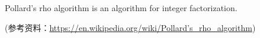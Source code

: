 \documentclass[a4paper, justified]{tufte-handout}
\begin{document}

\begin{ot}	
	Pollard's rho algorithm is an algorithm for integer factorization.
	
	(参考资料：\href{https://en.wikipedia.org/wiki/Pollard's_rho_algorithm}{https://en.wikipedia.org/wiki/Pollard's\_rho\_algorithm})
\end{ot}




% 




\beginfb

% 
% 
\end{document}

